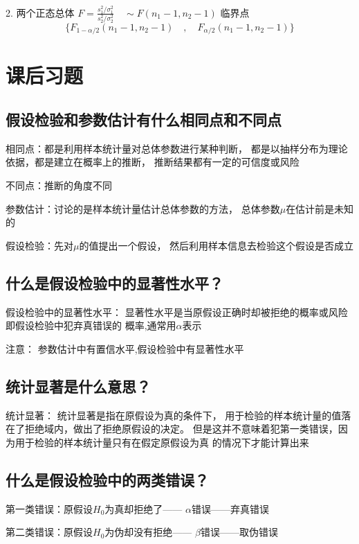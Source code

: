 \documentclass[UTF8,10pt]{book}
\begin{document}
    2. 两个正态总体	
    $F = \frac{s_1^2 / \sigma_1^2}{s_2^2 / \sigma_2^2} \quad \sim F(n_1-1,n_2-1)$ 
    临界点 $$ \{F_{1-\alpha / 2}(n_1-1,n_2-1) \quad , \quad F_{\alpha / 2}(n_1-1,n_2-1) \}$$
    \section{课后习题}
    {\kaishu
    \subsection{假设检验和参数估计有什么相同点和不同点}	
   
    
    相同点：都是利用样本统计量对总体参数进行某种判断，
    都是以抽样分布为理论依据，都是建立在概率上的推断，
    推断结果都有一定的可信度或风险 
    
    不同点：推断的角度不同 
    
    参数估计：讨论的是样本统计量估计总体参数的方法，
    总体参数$\mu$在估计前是未知的 
    
    假设检验：先对$\mu$的值提出一个假设，
    然后利用样本信息去检验这个假设是否成立

    \subsection{什么是假设检验中的显著性水平？}	
    假设检验中的显著性水平： 
    显著性水平是当原假设正确时却被拒绝的概率或风险即假设检验中犯弃真错误的
    概率,通常用$\alpha$表示 
    
    注意： 参数估计中有置信水平,假设检验中有显著性水平

    \subsection{统计显著是什么意思？}	
    
    统计显著： 统计显著是指在原假设为真的条件下，
    用于检验的样本统计量的值落在了拒绝域内，做出了拒绝原假设的决定。
    但是这并不意味着犯第一类错误，因为用于检验的样本统计量只有在假定原假设为真
    的情况下才能计算出来

    \subsection{什么是假设检验中的两类错误？}	
    第一类错误：原假设$H_0$为真却拒绝了—— $ \alpha $错误——弃真错误 
    
    第二类错误：原假设$H_0$为伪却没有拒绝—— $ \beta $错误——取伪错误

}
\end{document}
